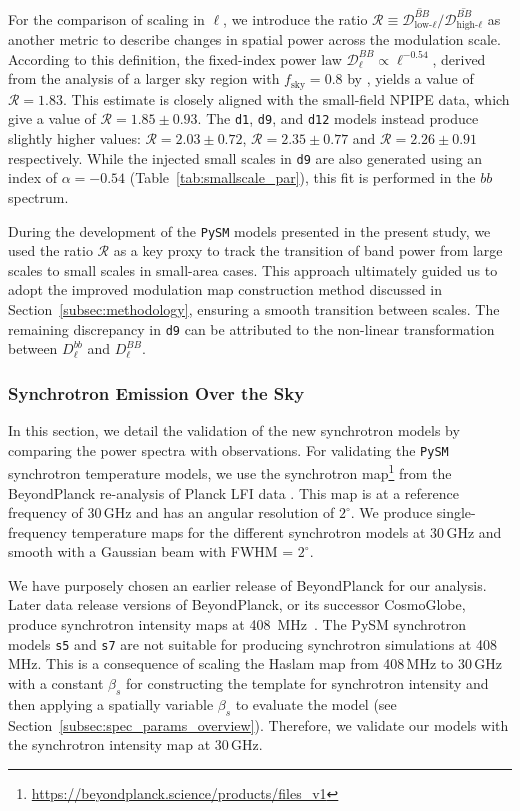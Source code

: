 \documentclass[twocolumn]{aastex631}
\begin{document}
For the comparison of scaling in $\ell$, we introduce the ratio $\mathcal{R} \equiv \overline{\mathcal{D}_{\text{low-}\ell}^{BB}} \Big/ \overline{\mathcal{D}_{\text{high-}\ell}^{BB}}$ as another metric to describe changes in spatial power across the modulation scale. According to this definition, the fixed-index power law $\mathcal{D}_\ell^{BB} \propto \ell^{-0.54}$, derived from the analysis of a larger sky region with $f_\text{sky} = 0.8$ by \cite{planck2016-l11A}, yields a value of $\mathcal{R} = 1.83$. This estimate is closely aligned with the small-field NPIPE data, which give a value of $\mathcal{R} = 1.85 \pm 0.93$. The \texttt{d1}, \texttt{d9}, and \texttt{d12} models instead produce slightly higher values: $\mathcal{R} = 2.03 \pm 0.72$, $\mathcal{R} = 2.35 \pm 0.77$ and $\mathcal{R} = 2.26 \pm 0.91$ respectively. While the injected small scales in \texttt{d9} are also generated using an index of $\alpha = -0.54$ (Table~\ref{tab:smallscale_par}), this fit is performed in the $bb$ spectrum. 

During the development of the \texttt{PySM} models presented in the present study, we used the ratio $\mathcal{R}$ as a key proxy to track the transition of band power from large scales to small scales in small-area cases. This approach ultimately guided us to adopt the improved modulation map construction method discussed in Section~\ref{subsec:methodology}, ensuring a smooth transition between scales. The remaining discrepancy in \texttt{d9} can be attributed to the non-linear transformation between $D_\ell^{bb}$ and $D_\ell^{BB}$.

\subsubsection{Synchrotron Emission Over the Sky} \label{sec:sync_validation}

In this section, we detail the validation of the new synchrotron models by comparing the power spectra with observations. For validating the \texttt{PySM} synchrotron temperature models, we use the synchrotron map\footnote{\url{https://beyondplanck.science/products/files\_v1}} from the BeyondPlanck re-analysis of Planck LFI data \citep{Andersen:2023}. This map is at a reference frequency of 30\,GHz and has an angular resolution of $2^\circ$. We produce single-frequency temperature maps for the different synchrotron models at 30\,GHz and smooth with a Gaussian beam with FWHM = $2^\circ$.

We have purposely chosen an earlier release of BeyondPlanck for our analysis. Later data release versions of BeyondPlanck, or its successor CosmoGlobe, produce synchrotron intensity maps at 408~MHz~\citep{Watts:2023}. The PySM synchrotron models \texttt{s5} and \texttt{s7} are not suitable for producing synchrotron simulations at 408\,MHz. This is a consequence of scaling the Haslam map from 408\,MHz to 30\,GHz with a constant $\beta_s$ for constructing the template for synchrotron intensity and then applying a spatially variable $\beta_s$ to evaluate the model (see Section~\ref{subsec:spec_params_overview}). Therefore, we validate our models with the synchrotron intensity map at 30\,GHz.
\end{document}
